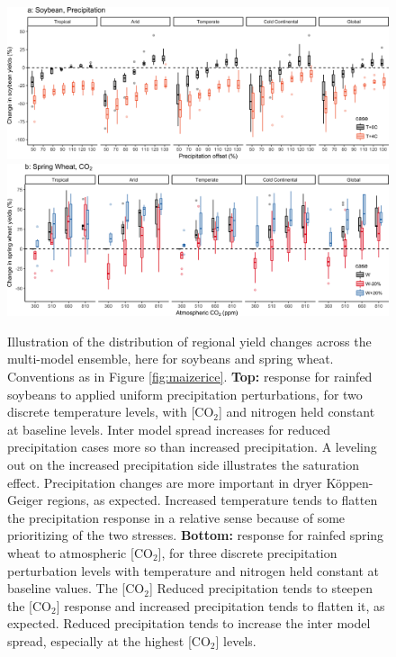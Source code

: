 \documentclass[gmd, manuscript]{copernicus} %
\begin{document}
\begin{figure}[ht]
\centering
  \includegraphics[width=15cm]{figures/soy_sim_CG_W.png}
  \includegraphics[width=15cm]{figures/swh_sim_CG_C.png}
  \caption{Illustration of the distribution of regional yield changes across the multi-model ensemble, here for soybeans and spring wheat. Conventions as in Figure \ref{fig:maizerice}.
  \textbf{Top:} response for rainfed soybeans to applied uniform precipitation perturbations, for two discrete temperature levels, with [CO$_2$] and nitrogen held constant at baseline levels. Inter model spread increases for reduced precipitation cases more so than increased precipitation. A leveling out on the increased precipitation side illustrates the saturation effect. Precipitation changes are more important in dryer K\"{o}ppen-Geiger regions, as expected.   Increased temperature tends to flatten the precipitation response in a relative sense because of some prioritizing of the two stresses. 
  \textbf{Bottom:} response for rainfed spring wheat to atmospheric [CO$_2$], for three discrete precipitation perturbation levels with temperature and nitrogen held constant at baseline values.
  The [CO$_2$] 
  Reduced precipitation tends to steepen the [CO$_2$] response and increased precipitation tends to flatten it, as expected. Reduced precipitation tends to increase the inter model spread, especially at the highest [CO$_2$] levels.
   }
   \label{fig:soywheat}
\end{figure}
\end{document}
